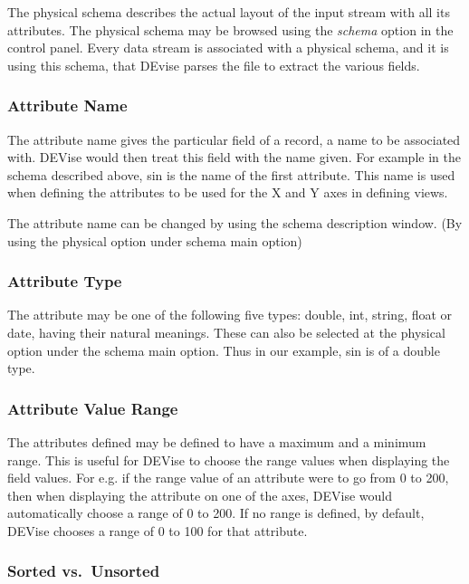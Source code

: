  The physical schema describes the actual layout of the input stream with all its attributes. The physical schema may be browsed using the {\em schema} option in the control panel. Every data stream is associated with a physical schema, and it is using this schema, that DEvise parses the file to extract the various fields.


\subsubsection{Attribute Name}

 The attribute name gives the particular field of a record, a name to be associated with. DEVise would then treat this field with the name given. For example in the schema described above, sin is the name of the first attribute. This name is used when defining the attributes to be used for the X and Y axes in defining views.

 The attribute name can be changed by using the schema description window. (By using the physical option under schema main option) 


\subsubsection{Attribute Type}

 The attribute may be one of the following five types: double, int, string, float or date, having their natural meanings. These can also be selected at the physical option under the schema main option. Thus in our example, sin is of a double type.

\subsubsection{Attribute Value Range}

 The attributes defined may be defined to have a maximum and a minimum range. This is useful for DEVise to choose the range values when displaying the field values. For e.g. if the range value of an attribute were to go from 0 to 200, then when displaying the attribute on one of the axes, DEVise would automatically choose a range of 0 to 200. If no range is defined, by default, DEVise chooses a range of 0 to 100 for that attribute.

\subsubsection{Sorted vs.\ Unsorted}

